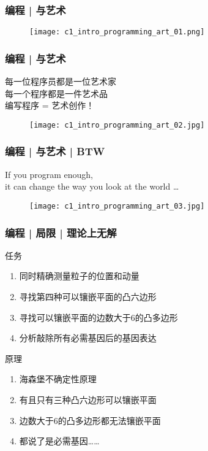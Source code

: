 \begin{frame}
  \frametitle{编程 | 与艺术}
  \begin{figure}
    \centering
    \texttt{[image: c1\_intro\_programming\_art\_01.png]}
  \end{figure}
\end{frame}

\begin{frame}
  \frametitle{编程 | 与艺术}
  \begin{center}
    \large{每一位程序员都是一位艺术家\\
    每一个程序都是一件艺术品\\
    编写程序 = 艺术创作！}
\end{center}
\vspace{-1em}
  \begin{figure}
    \centering
    \texttt{[image: c1\_intro\_programming\_art\_02.jpg]}
  \end{figure}
\end{frame}

\begin{frame}
  \frametitle{编程 | 与艺术 | BTW}
  \begin{center}
    \large{If you program enough,\\ it can change the way you look at the world …}
\end{center}
\vspace{-1em}
  \begin{figure}
    \centering
    \texttt{[image: c1\_intro\_programming\_art\_03.jpg]}
  \end{figure}
\end{frame}

\begin{frame}
  \frametitle{编程 | 局限 | 理论上无解}
  \begin{block}{任务}
    \begin{enumerate}
      \item<1-> 同时精确测量粒子的位置和动量
      \item<2-> 寻找第四种可以镶嵌平面的凸六边形
      \item<3-> 寻找可以镶嵌平面的边数大于6的凸多边形
      \item<4-> 分析敲除所有必需基因后的基因表达
    \end{enumerate}
  \end{block}
  \begin{block}{原理}
    \begin{enumerate}
      \item<1-> 海森堡不确定性原理
      \item<2-> 有且只有三种凸六边形可以镶嵌平面
      \item<3-> 边数大于6的凸多边形都无法镶嵌平面
      \item<4-> 都说了是必需基因……
    \end{enumerate}
  \end{block}
\end{frame}

